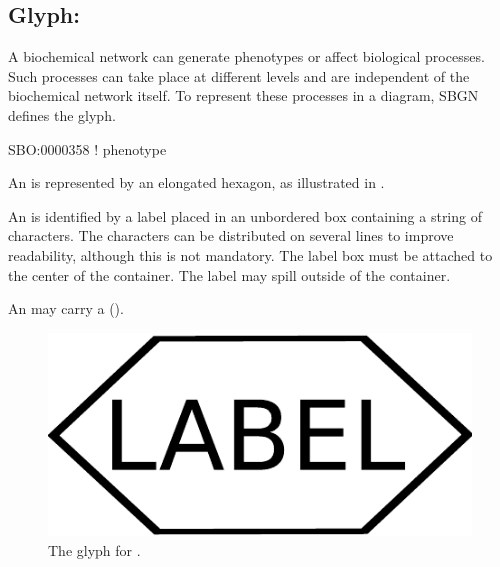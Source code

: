 
\subsection{Glyph: }
\label{sec:observable}

A biochemical network can generate phenotypes or affect biological
processes.  Such processes can take place at different levels and are
independent of the biochemical network itself.  To represent these
processes in a diagram, SBGN defines the  glyph.

\begin{glyphDescription}

\glyphSboTerm SBO:0000358 ! phenotype

\glyphContainer An  is represented by an elongated
hexagon, as illustrated in .

\glyphLabel An  is identified by a label placed in an
unbordered box containing a string of characters.  The characters can be
distributed on several lines to improve readability, although this is not
mandatory.  The label box must be attached to the center of the
 container.  The label may spill outside of the container.

\glyphAux An  may carry a 
().

\end{glyphDescription}
 
\begin{figure}[H]
  \centering
  \includegraphics[scale = 0.3]{images/observable}
  \caption{The \PD glyph for .}
  \label{fig:observable}
\end{figure}

